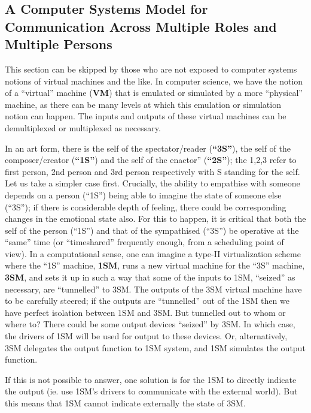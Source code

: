 \subsection{A Computer Systems Model for Communication Across Multiple Roles and Multiple Persons}\label{chap3-sec4.2}

This section can be skipped by those who are not exposed to computer systems notions of virtual machines and the like. In computer science, we have the notion of a “virtual” machine (\textbf{VM}) that is emulated or simulated by a more “physical” machine, as there can be many levels at which this emulation or simulation notion can happen. The inputs and outputs of these virtual machines can be demultiplexed or multiplexed as necessary.

In an art form, there is the self of the spectator/reader (\textbf{“3S”}), the self of the composer/creator (\textbf{“1S”}) and the self of the enactor” (\textbf{“2S”}); the 1,2,3 refer to first person, 2nd person and 3rd person respectively with S standing for the self. Let us take a simpler case first. Crucially, the ability to empathise with someone depends on a person (“1S”) being able to imagine the state of someone else (“3S”); if there is considerable depth of feeling, there could be corresponding changes in the emotional state also. For this to happen, it is critical that both the self of the person (“1S”) and that of the sympathised (“3S”) be operative at the “same” time (or “timeshared” frequently enough, from a scheduling point of view). In a computational sense, one can imagine a type-II virtualization scheme where the “1S” machine, \textbf{1SM}, runs a new virtual machine for the “3S” machine, \textbf{3SM}, and sets it up in such a way that some of the inputs to 1SM, “seized” as necessary, are “tunnelled” to 3SM. The outputs of the 3SM virtual machine have to be carefully steered; if the outputs are “tunnelled” out of the 1SM then we have perfect isolation between 1SM and 3SM. But tunnelled out to whom or where to? There could be some output devices “seized” by 3SM. In which case, the drivers of 1SM will be used for output to these devices. Or, alternatively, 3SM delegates the output function to 1SM system, and 1SM simulates the output function.

If this is not possible to answer, one solution is for the 1SM to directly indicate the output (ie. use 1SM’s drivers to communicate with the external world). But this means that 1SM cannot indicate externally the state of 3SM. 

